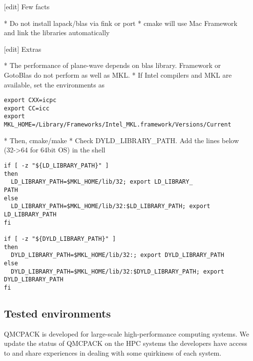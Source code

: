 [edit] Few facts

    * Do not install lapack/blas via fink or port
    * cmake will use Mac Framework and link the libraries automatically 

[edit] Extras

    * The performance of plane-wave depends on blas library. Framework or GotoBlas do not perform as well as MKL.
    * If Intel compilers and MKL are available, set the environments as 

\begin{verbatim}
export CXX=icpc
export CC=icc
export MKL_HOME=/Library/Frameworks/Intel_MKL.framework/Versions/Current
\end{verbatim}

    * Then, cmake/make
    * Check DYLD\_LIBRARY\_PATH. Add the lines below (32->64 for 64bit OS) in the shell 

\begin{verbatim}
if [ -z "${LD_LIBRARY_PATH}" ]
then
  LD_LIBRARY_PATH=$MKL_HOME/lib/32; export LD_LIBRARY_
PATH
else
  LD_LIBRARY_PATH=$MKL_HOME/lib/32:$LD_LIBRARY_PATH; export LD_LIBRARY_PATH
fi

if [ -z "${DYLD_LIBRARY_PATH}" ]
then
  DYLD_LIBRARY_PATH=$MKL_HOME/lib/32:; export DYLD_LIBRARY_PATH
else
  DYLD_LIBRARY_PATH=$MKL_HOME/lib/32:$DYLD_LIBRARY_PATH; export DYLD_LIBRARY_PATH
fi
\end{verbatim}

\subsection{Tested environments}
QMCPACK is developed for large-scale high-performance computing systems. We update the status of QMCPACK on the HPC systems the developers have access to and share experiences in dealing with some quirkiness of each system.

